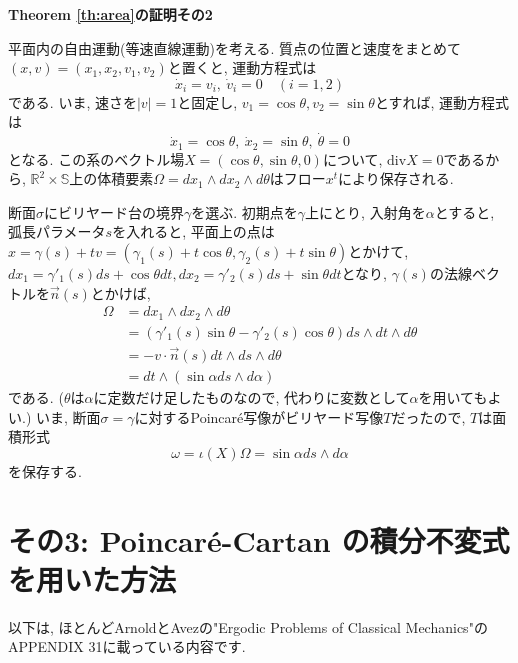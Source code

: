 \documentclass[a4paper]{ujarticle}
\makeatletter
\newcommand{\Div}{\mathrm{div}}
\numberwithin{equation}{section}
\theoremstyle{definition}
\renewenvironment{proof}[1][Proof]{\par
  \pushQED{\qed}%
  \normalfont \topsep6\p@\@plus6\p@\relax
  \trivlist
  \item\relax
  {\bfseries
  #1\@addpunct{.}}\hspace\labelsep\ignorespaces
}{%
  \popQED\endtrivlist\@endpefalse
}
\makeatother
\begin{document}
    \begin{proof}[Theorem \ref{th:area}の証明その2]
        平面内の自由運動(等速直線運動)を考える. 
        質点の位置と速度をまとめて$(x, v) = (x_1, x_2, v_1, v_2)$と置くと, 運動方程式は
        \[
            \dot{x}_i = v_{i}, \ \dot{v}_i = 0 \quad (i = 1, 2)
        \]  
        である.
        いま, 速さを$|v| = 1$と固定し, $v_1 = \cos \theta, v_2 = \sin \theta$とすれば,
        運動方程式は
        \[
            \dot{x}_1 = \cos \theta, \ \dot{x}_2 = \sin \theta, \ \dot{\theta} = 0
        \]
        となる.
        この系のベクトル場$X = (\cos \theta, \sin \theta, 0)$について, $\Div X = 0$であるから,
        $\mathbb{R}^2 \times \mathbb{S}$上の体積要素$\Omega = d x_1 \wedge d x_2 \wedge d \theta$はフロー$x^{t}$により保存される.

        断面$\sigma$にビリヤード台の境界$\gamma$を選ぶ.
        初期点を$\gamma$上にとり, 入射角を$\alpha$とすると, 
        弧長パラメータ$s$を入れると,
        平面上の点は$x = \gamma(s) + tv = (\gamma_1(s) + t \cos \theta, \gamma_2(s)+ t \sin \theta)$とかけて, 
        $dx_1 = \gamma'_1(s) ds + \cos \theta d t, dx_2 = \gamma'_2(s) ds + \sin \theta d t$となり, 
        $\gamma(s)$の法線ベクトルを$\vec{n}(s)$とかけば, 
        \begin{align}
            \Omega &= d x_1 \wedge d x_2 \wedge d \theta \\
            &= (\gamma'_1(s) \sin \theta - \gamma'_2(s) \cos \theta) ds \wedge dt \wedge d \theta \\
            &= - v \cdot \vec{n}(s) dt \wedge ds \wedge d \theta \\
            &= dt \wedge (\sin \alpha ds \wedge d \alpha)
        \end{align}
        である. ($\theta$は$\alpha$に定数だけ足したものなので, 代わりに変数として$\alpha$を用いてもよい.)
        いま, 断面$\sigma = \gamma$に対するPoincar\'{e}写像がビリヤード写像$T$だったので, $T$は面積形式
        \[
            \omega = \iota(X) \Omega = \sin \alpha ds \wedge d \alpha
        \]
        を保存する.
    \end{proof}


\section{その3: Poincar\'{e}-Cartan の積分不変式を用いた方法}

    以下は, ほとんどArnoldとAvezの"Ergodic Problems of Classical Mechanics"\cite{ArnoldAvez}のAPPENDIX 31に載っている内容です. 
    
\end{document}
